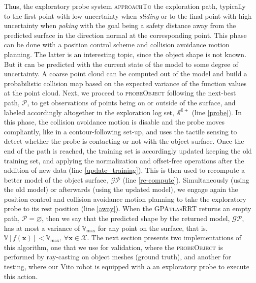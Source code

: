 Thus, the exploratory probe system \textsc{approachTo} the exploration path, typically to the first point with low uncertainty when \emph{sliding} or to the final point with high uncertainty when \emph{poking} with the goal being a safety distance away from the predicted surface in the direction normal at the corresponding point. This phase can be done with a position control scheme and collision avoidance motion planning. The latter is an interesting topic, since the object shape is not known. But it can be predicted with the current state of the model to some degree of uncertainty. A coarse point cloud can be computed out of the model and build a probabilistic collision map based on the expected variance of the function values at the point cloud. Next, we proceed to \textsc{probeObject} following the next-best path, $\mathcal{P}$, to get observations of points being on or outside of the surface, and labeled accordingly altogether in the exploration log set, $\mathcal{S}^{0+}$ (line \ref{probe}). In this phase, the collision avoidance motion is disable and the probe moves compliantly, like in a contour-following set-up, and uses the tactile sensing to detect whether the probe is contacting or not with the object surface. Once the end of the path is reached, the training set is accordingly updated keeping the old training set, and applying the normalization and offset-free operations after the addition of new data (line \ref{update_training}). This is then used to recompute a better model of the object surface, $\mathcal{GP}$ (line \ref{re-compute}). Simultaneously (using the old model) or afterwards (using the updated model), we engage again the position control and collision avoidance motion planning to take the exploratory probe to its rest position (line \ref{away}). When the \textsc{GPAtlasRRT} returns an empty path, $\mathcal{P} = \varnothing$, then we say that the predicted shape by the returned model, $\mathcal{GP}$, has at most a variance of $\mathbb{V}_{\max}$ for any point on the surface, that is, $\mathbb{V}[f(\mathbf{x})] < \mathbb{V}_{\max}, \, \forall \mathbf{x} \in \mathcal{X}$. The next section presents two implementations of this algorithm, one that we use for validation, where the \textsc{probeObject} is performed by ray-casting on object meshes (ground truth), and another for testing, where our Vito robot is equipped with a an exploratory probe to execute this action.

